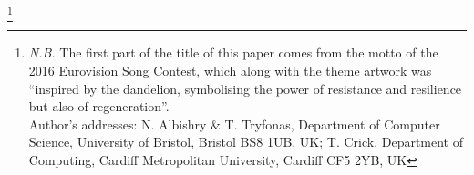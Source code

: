 \documentclass[sigconf]{acmart}
\begin{document}
%
%




\thanks{{\emph{N.B.}} The first part of the title of this paper comes
from the motto of the 2016 Eurovision Song Contest, which along with
the theme artwork was ``inspired by the dandelion, symbolising the
power of resistance and resilience but also of regeneration''.\\

Author's addresses: N. Albishry \& T. Tryfonas, Department of
Computer Science, University of Bristol, Bristol BS8 1UB, UK;
T. Crick, Department of Computing, Cardiff Metropolitan University,
Cardiff CF5 2YB, UK}


\maketitle




 
\end{document}
